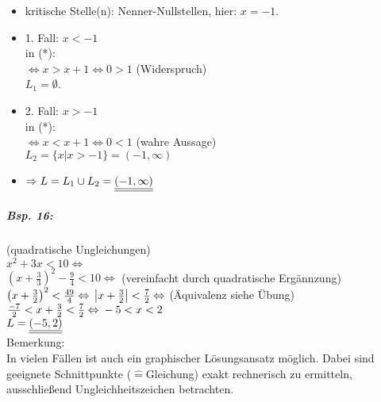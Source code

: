 \begin{itemize}
\item kritische Stelle(n): Nenner-Nullstellen, hier: $x=-1$.\\
\item 1. Fall: $x<-1$\\
in (*):\\
$\Leftrightarrow x>x+1 \Leftrightarrow 0>1$ (Widerspruch)\\
$L_1=\emptyset$.
\item 2. Fall: $x > -1$\\
in (*):\\
$\Leftrightarrow x < x+1 \Leftrightarrow 0<1$ (wahre Aussage)\\
$L_2=\{x|x>-1\}=(-1,\infty)$
\item $\Rightarrow L = L_1 \cup L_2 = \underline{\underline{(-1,\infty)}}$
\end{itemize}

\subparagraph{Bsp. 16:} (quadratische Ungleichungen)\\
$x^2+3x<10 \Leftrightarrow$ \\
$\left( x+\frac{3}{3}\right)^2-\frac{9}{4}<10 \Leftrightarrow$ (vereinfacht durch quadratische Ergännzung)\\
$\left( x+\frac{3}{2}\right)^2<\frac{49}{4} \Leftrightarrow\\
\left|x+\frac{3}{2}\right|<\frac{7}{2} \Leftrightarrow$ (Äquivalenz siehe Übung) \\
$\frac{-7}{2}<x+\frac{3}{2}<\frac{7}{2} \Leftrightarrow\\
-5<x<2$\\
$L=\underline{\underline{(-5,2)}}$\medskip\\
Bemerkung:\\
In vielen Fällen ist auch ein graphischer Lösungsansatz möglich. Dabei sind geeignete Schnittpunkte ($\widehat{=}$Gleichung) exakt rechnerisch zu ermitteln, ausschließend Ungleichheitszeichen betrachten.

